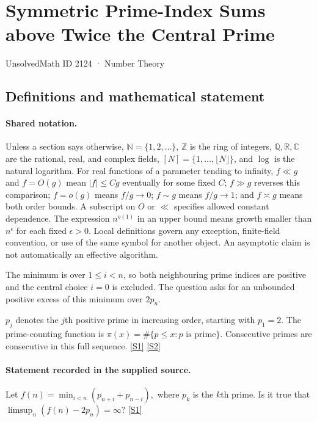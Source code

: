 \documentclass[11pt,a4paper]{article}
\newcommand{\N}{\mathbb{N}}
\newcommand{\Z}{\mathbb{Z}}
\newcommand{\Q}{\mathbb{Q}}
\newcommand{\R}{\mathbb{R}}
\newcommand{\C}{\mathbb{C}}
\newcommand{\sref}[2]{\hyperlink{source:#1:#2}{[S#2]}}
\begin{document}

\setcounter{section}{2123}

\section{Symmetric Prime-Index Sums above Twice the Central Prime}\label{2124}

{\small\sffamily UnsolvedMath ID 2124 · Number Theory}

\subsection{Definitions and mathematical statement}

\paragraph{Shared notation.}Unless a section says otherwise, $\N=\{1,2,\ldots\}$,
$\Z$ is the ring of integers, $\Q,\R,\C$ are the rational, real, and complex
fields, $[N]=\{1,\ldots,\lfloor N\rfloor\}$, and $\log$ is the natural
logarithm. For real functions of a parameter tending to infinity,
$f\ll g$ and $f=O(g)$ mean $|f|\leq Cg$ eventually for some fixed $C$;
$f\gg g$ reverses this comparison; $f=o(g)$ means $f/g\to0$;
$f\sim g$ means $f/g\to1$; and $f\asymp g$ means both order bounds.
A subscript on $O$ or $\ll$ specifies allowed constant dependence.
The expression $n^{o(1)}$ in an upper bound means growth smaller than
$n^\epsilon$ for each fixed $\epsilon>0$. Local definitions govern any
exception, finite-field convention, or use of the same symbol for another
object. An asymptotic claim is not automatically an effective algorithm.



The minimum is over $1\leq i<n$, so both neighbouring prime indices are positive and the central choice $i=0$ is excluded. The question asks for an unbounded positive excess of this minimum over $2p_n$.

$p_j$ denotes the $j$th positive prime in increasing order, starting with $p_1=2$. The prime-counting function is $\pi(x)=\#\{p\leq x:p\text{ is prime}\}$. Consecutive primes are consecutive in this full sequence. \sref{2124}{1} \sref{2124}{2}

\paragraph{Statement recorded in the supplied source.}
Let $ f(n) = \min_{i<n} (p_{n+i}+p_{n-i}), $ where $p_k$ is the $k$th prime. Is it true that $ \limsup_n (f(n)-2p_n)=\infty? $ \sref{2124}{1}
\end{document}
